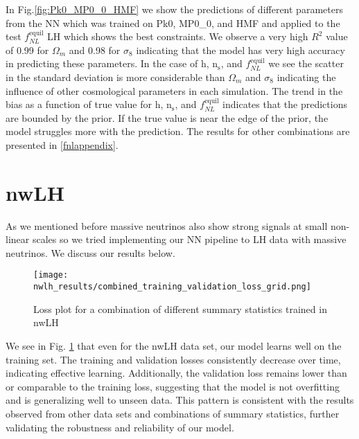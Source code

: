 In Fig.\ref{fig:Pk0_MP0_0_HMF} we show the predictions of different parameters from the NN which was trained on Pk0, MP0\_0, and HMF and applied to the test $f_{NL}^{\mathrm{equil}}$ LH which shows the best constraints. We observe a very high $R^2$ value of 0.99 for $\Omega_{m}$ and 0.98 for $\sigma_{8}$ indicating that the model has very high accuracy in predicting these parameters. In the case of $\mathrm{h}$, $\mathrm{n_{s}}$, and $f_{NL}^{\mathrm{equil}}$ we see the scatter in the standard deviation is more considerable than $\Omega_{m}$ and $\sigma_{8}$ indicating the influence of other cosmological parameters in each simulation. The trend in the bias as a function of true value for $\mathrm{h}$, $\mathrm{n_{s}}$, and $f_{NL}^{\mathrm{equil}}$ indicates that the predictions are bounded by the prior. If the true value is near the edge of the prior, the model struggles more with the prediction. The results for other combinations are presented in \ref{fnlappendix}.


\section{nwLH}

As we mentioned before massive neutrinos also show strong signals at small non-linear scales so we tried implementing our NN pipeline to LH data with massive neutrinos. We discuss our results below. \\


\begin{figure}[htbp]
    \centering
    \texttt{[image: nwlh\_results/combined\_training\_validation\_loss\_grid.png]}
    \caption{Loss plot for a combination of different summary statistics trained in nwLH }
    \label{fig:mnu_loss_plot}
\end{figure}

We see in Fig. \ref{fig:mnu_loss_plot} that even for the nwLH data set, our model learns well on the training set. The training and validation losses consistently decrease over time, indicating effective learning. Additionally, the validation loss remains lower than or comparable to the training loss, suggesting that the model is not overfitting and is generalizing well to unseen data. This pattern is consistent with the results observed from other data sets and combinations of summary statistics, further validating the robustness and reliability of our model.

